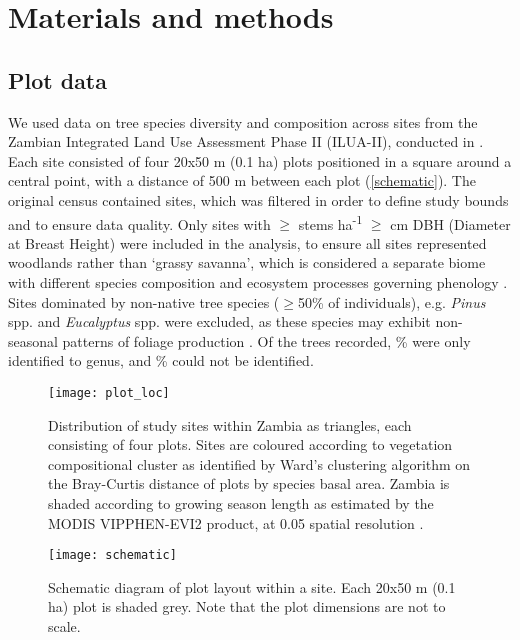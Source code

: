 \documentclass[11pt,a4paper]{article}
\begin{document}
\section{Materials and methods}

\subsection{Plot data}

We used data on tree species diversity and composition across \nSites{} sites from the Zambian Integrated Land Use Assessment Phase II (ILUA-II), conducted in \censusDate{} \citep{Mukosha2009, Pelletier2018}. Each site consisted of four 20x50 m (0.1 ha) plots positioned in a square around a central point, with a distance of 500 m between each plot (\autoref{schematic}). The original census contained \nTotalSites{} sites, which was filtered in order to define study bounds and to ensure data quality. Only sites with $\geq$\treesHa{} stems ha\textsuperscript{-1} $\geq$\stemSize{} cm DBH (Diameter at Breast Height) were included in the analysis, to ensure all sites represented woodlands rather than `grassy savanna', which is considered a separate biome with different species composition and ecosystem processes governing phenology \citep{Parr2014}. Sites dominated by non-native tree species ($\geq$50\% of individuals), e.g. \textit{Pinus} spp. and \textit{Eucalyptus} spp. were excluded, as these species may exhibit non-seasonal patterns of foliage production \citep{Broadhead2003}. Of the \nTrees{} trees recorded, \perSpIndet{}\% were only identified to genus, and \perGenIndet{}\% could not be identified.

\begin{figure}[H]
\centering
	\texttt{[image: plot\_loc]}
	\caption{Distribution of study sites within Zambia as triangles, each consisting of four plots. Sites are coloured according to vegetation compositional cluster as identified by Ward's clustering algorithm on the Bray-Curtis distance of plots by species basal area. Zambia is shaded according to growing season length as estimated by the MODIS VIPPHEN-EVI2 product, at 0.05\textdegree{} spatial resolution \citep{VIPPHEN}.}
	\label{plot_loc}
\end{figure}

\begin{figure}[H]
\centering
	\texttt{[image: schematic]}
	\caption{Schematic diagram of plot layout within a site. Each 20x50 m (0.1 ha) plot is shaded grey. Note that the plot dimensions are not to scale.}
	\label{schematic}
\end{figure}
\end{document}
